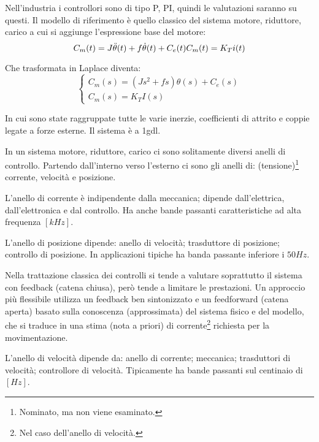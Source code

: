 Nell'industria i controllori sono di tipo P, PI, quindi le valutazioni saranno su questi.
Il modello di riferimento è quello classico del sistema motore, riduttore, carico a cui si aggiunge l'espressione base del motore:
\[
    C_m(t) = J \Ddot{\theta}(t) + f \dot{\theta}(t) + C_e (t) \\
    C_m(t) = K_T i(t)
\]

Che trasformata in Laplace diventa:
\[
\begin{cases}
    C_m(s)=(Js^2+fs)\theta(s) + C_e (s) \\
    C_m(s)=K_T I(s)
\end{cases}
\]

In cui sono state raggruppate tutte le varie inerzie, coefficienti di attrito e coppie legate a forze esterne.
Il sistema è a 1gdl.

In un sistema motore, riduttore, carico ci sono solitamente diversi anelli di controllo. Partendo dall'interno verso l'esterno ci sono gli anelli di: (tensione)\footnote{Nominato, ma non viene esaminato.} corrente, velocità e posizione.

L'anello di corrente è indipendente dalla meccanica; dipende dall'elettrica, dall'elettronica e dal controllo. Ha anche bande passanti caratteristiche ad alta frequenza \([kHz]\).

L'anello di posizione dipende: anello di velocità; trasduttore di posizione; controllo di posizione. In applicazioni tipiche ha banda passante inferiore i \(50 Hz\). 

Nella trattazione classica dei controlli si tende a valutare soprattutto il sistema con feedback (catena chiusa), però tende a limitare le prestazioni. Un approccio più flessibile utilizza un feedback ben sintonizzato e un feedforward (catena aperta) basato sulla conoscenza (approssimata) del sistema fisico e del modello, che si traduce in una stima (nota a priori) di corrente\footnote{Nel caso dell'anello di velocità.} richiesta per la movimentazione.



L'anello di velocità dipende da: anello di corrente; meccanica; trasduttori di velocità; controllore di velocità.
Tipicamente ha bande passanti sul centinaio di \([Hz]\).

